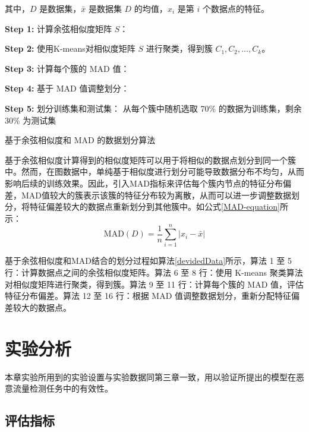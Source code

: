 \documentclass[promaster]{thesis-uestc}
\begin{document}
其中，$D$ 是数据集，$\bar{x}$ 是数据集 $D$ 的均值，$x_i$ 是第 $i$ 个数据点的特征。


\begin{algorithm}[h!]
\SetAlgoLined
{}

\textbf{Step 1:} 计算余弦相似度矩阵 $S$：\;

\textbf{Step 2:} 使用K-means对相似度矩阵 $S$ 进行聚类，得到簇 $C_1, C_2, \dots, C_k$。

\textbf{Step 3:} 计算每个簇的 MAD 值：\;

\textbf{Step 4:} 基于 MAD 值调整划分：\;

\textbf{Step 5:} 划分训练集和测试集：\;
从每个簇中随机选取 70\% 的数据为训练集，剩余 30\% 为测试集\;
\caption{基于余弦相似度和 MAD 的数据划分算法}
\label{devidedData}
\end{algorithm}
基于余弦相似度计算得到的相似度矩阵可以用于将相似的数据点划分到同一个簇中。然而，在图数据中，单纯基于相似度进行划分可能导致数据分布不均匀，从而影响后续的训练效果。因此，引入MAD指标来评估每个簇内节点的特征分布偏差，MAD值较大的簇表示该簇的特征分布较为离散，从而可以进一步调整数据划分，将特征偏差较大的数据点重新划分到其他簇中。如公式\ref{MAD-equation}所示：
\begin{equation}
\text{MAD}(D) = \frac{1}{n} \sum_{i=1}^{n} |x_i - \bar{x}|
\label{MAD-equation}
\end{equation}

基于余弦相似度和MAD结合的划分过程如算法\ref{devidedData}所示，算法 1 至 5 行：计算数据点之间的余弦相似度矩阵。算法 6 至 8 行：使用 K-means 聚类算法对相似度矩阵进行聚类，得到簇。算法 9 至 11 行：计算每个簇的 MAD 值，评估特征分布偏差。算法 12 至 16 行：根据 MAD 值调整数据划分，重新分配特征偏差较大的数据点。


\section{实验分析}
本章实验所用到的实验设置与实验数据同第三章一致，用以验证所提出的模型在恶意流量检测任务中的有效性。
\subsection{评估指标}
\end{document}
